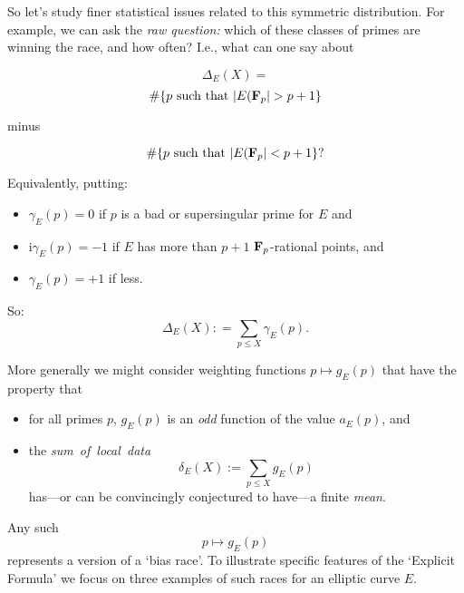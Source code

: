 \documentclass[12pt]{beamer}
\theoremstyle{definition}
\begin{document}
\begin{frame}
 \vskip40pt {\Large   So let's study  finer statistical issues related to this symmetric distribution.   For example,  we can ask the {\it raw question:}  which of these classes of primes are winning the race, and how often? I.e., what can one say about   }  \end{frame}

\begin{frame}
 \vskip40pt {\Large  
 $$\Delta_E(X) =$$  \vskip20pt $$ \#\{p \ {\rm such\ that\ } |E({\bf F}_p| > p+1\}$$ \vskip10pt \centerline{minus} \vskip10pt  $$ \#\{p \ {\rm such\ that\ } |E({\bf F}_p| < p+1\}?$$}  \end{frame}

\begin{frame}
 \vskip40pt {\Large  Equivalently, putting:\begin{itemize} \item $\gamma_E(p)=0$ if $p$ is a bad or supersingular prime for $E$ and\vskip20pt \item i$\gamma_E(p)= -1$ if $E$ has more than $p+1$  ${\bf F}_p$-rational points, and \vskip20pt \item $\gamma_E(p) = +1$ if less.\end{itemize}}\end{frame}\begin{frame}\vskip20pt
{\Large \vskip40pt 
 So:\vskip20pt
   $$\Delta_E(X): =\sum_{p\le X}\gamma_E(p).$$
 
 
 More generally we might consider  weighting functions $p \mapsto g_E(p)$ that have the property that }  \end{frame}\begin{frame}\vskip20pt
{\Large \vskip40pt 
\begin{itemize} \item for all primes $p$, $g_E(p)$ is an {\it odd} function of the value  $a_E(p)$, and \vskip20pt \item the {\it sum\ of\ local\ data}  $$\delta_E(X):=\sum_{p\le X}g_E(p)$$ has---or can be convincingly conjectured to have---a finite  {\it mean}.\end{itemize}}\end{frame}
\begin{frame}\vskip20pt
{\Large \vskip40pt 
Any such  $$p \mapsto  g_E(p)$$ represents a version of a `bias race'.
\vskip20pt
To illustrate specific features of the `Explicit Formula' we focus on three examples of such races for an elliptic curve $E$. }\end{frame}
\end{document}
